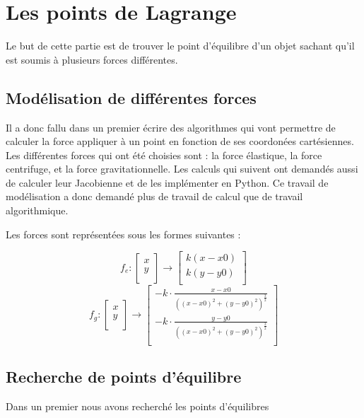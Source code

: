 \section{Les points de Lagrange}
Le but de cette partie est de trouver le point d'équilibre d'un objet sachant qu'il est soumis à plusieurs forces différentes.

\subsection{Modélisation de différentes forces}
Il a donc fallu dans un premier écrire des algorithmes qui vont permettre de calculer la force appliquer à un point en fonction de ses
coordonées cartésiennes. Les différentes forces qui ont été choisies sont : la force élastique, la force centrifuge, et la force gravitationnelle.
Les calculs qui suivent ont demandés aussi de calculer leur Jacobienne et de les implémenter en Python. Ce travail de modélisation a donc demandé plus
de travail de calcul que de travail algorithmique.


Les forces sont représentées sous les formes suivantes :

\begin{equation*}
    f_e : \left[\begin{array}{cccccc}
        x \\
        y \\
      \end{array} \right]
      \rightarrow
      \left[\begin{array}{cccccc}
        k(x-x0) \\
        k(y-y0) \\
      \end{array} \right]
\end{equation*}
\begin{equation*}
    f_g : \left[\begin{array}{cccccc}
        x \\
        y \\
      \end{array} \right]
      \rightarrow
      \left[\begin{array}{cccccc}
        -k\cdot \frac{x-x0}{((x-x0)^2+(y-y0)^2)^{\frac{3}{2}}} \\
        -k\cdot \frac{y-y0}{((x-x0)^2+(y-y0)^2)^{\frac{3}{2}}} \\
      \end{array} \right]
\end{equation*}

\subsection{Recherche de points d'équilibre}
Dans un premier nous avons recherché les points d'équilibres 
